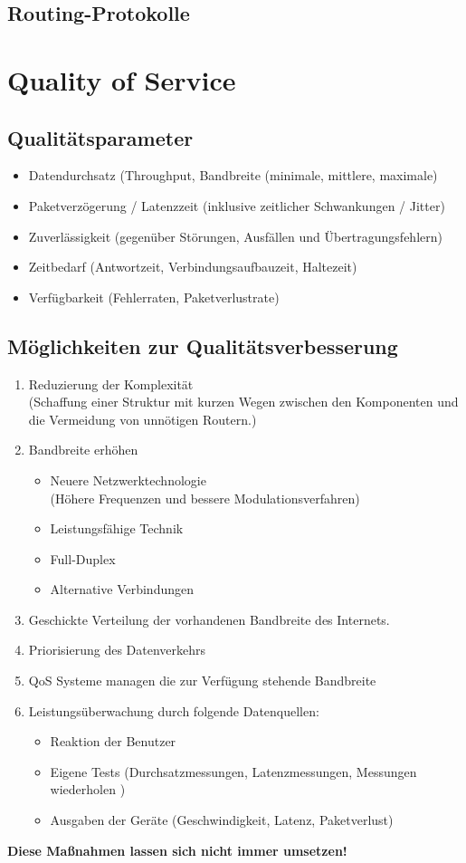 \documentclass{article} %
\begin{document}
\subsection{Routing-Protokolle}

\section{Quality of Service}
\label{sec:qos}
\subsection{Qualitätsparameter}
	\begin{itemize}
	\item Datendurchsatz (Throughput, Bandbreite (minimale, mittlere, maximale)
	\item Paketverzögerung / Latenzzeit (inklusive zeitlicher Schwankungen / Jitter)
	\item Zuverlässigkeit (gegenüber Störungen,  Ausfällen und Übertragungsfehlern)
	\item Zeitbedarf (Antwortzeit,  Verbindungsaufbauzeit,  Haltezeit)
	\item Verfügbarkeit (Fehlerraten,  Paketverlustrate)
	\end{itemize}
	
\subsection{Möglichkeiten zur Qualitätsverbesserung}
	\begin{enumerate}
	\item Reduzierung der Komplexität\\
	(Schaffung einer Struktur mit kurzen Wegen zwischen den Komponenten und die Vermeidung von unnötigen Routern.)
	\item Bandbreite erhöhen
		\begin{itemize}
		\item Neuere Netzwerktechnologie\\
		(Höhere Frequenzen und bessere Modulationsverfahren)
		\item Leistungsfähige Technik
		\item Full-Duplex
		\item Alternative Verbindungen
		\end{itemize}
	\item Geschickte Verteilung der vorhandenen Bandbreite des Internets.
	\item Priorisierung des Datenverkehrs
	\item QoS Systeme managen die zur Verfügung stehende Bandbreite
	\item Leistungsüberwachung durch folgende Datenquellen:
		\begin{itemize}
		\item Reaktion der Benutzer
		\item Eigene Tests (Durchsatzmessungen, Latenzmessungen, Messungen wiederholen )
		\item Ausgaben der Geräte (Geschwindigkeit, Latenz, Paketverlust)
		\end{itemize}
	\end{enumerate}
\textbf{Diese Maßnahmen lassen sich nicht immer umsetzen!}
\end{document}
